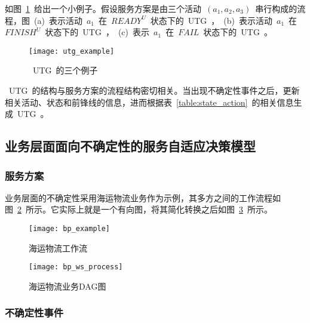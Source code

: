 如图~\ref{figure:utg_example}~给出一个小例子。假设服务方案是由三个活动~$(a_1, a_2, a_3)$~串行构成的流程，图~(a)~表示活动~$a_1$~在~$READY^U$~状态下的~UTG~，~(b)~表示活动~$a_1$~在~$FINISH^U$~状态下的~UTG~，~(c)~表示~$a_1$~在~$FAIL$~状态下的~UTG~。

\begin{figure}[htbp]
    \centering
    \texttt{[image: utg\_example]}
    \caption{~UTG~的三个例子}\label{figure:utg_example}
    \vspace{-1em}
\end{figure}

~UTG~的结构与服务方案的流程结构密切相关。当出现不确定性事件之后，更新相关活动、状态和前锋线的信息，进而根据表~\ref{table:state_action}~的相关信息生成~UTG~。

\subsection{业务层面面向不确定性的服务自适应决策模型}

\subsubsection{服务方案}

%

业务层面的不确定性采用海运物流业务作为示例，其多方之间的工作流程如图~\ref{figure:bp_example}~所示。它实际上就是一个有向图，将其简化转换之后如图~\ref{figure:bp_ws_process}~所示。

\begin{figure}[htbp]
    \centering
    \texttt{[image: bp\_example]}
    \caption{海运物流工作流}\label{figure:bp_example}
    \vspace{-1em}
\end{figure}

\begin{figure}[htbp]
    \centering
    \texttt{[image: bp\_ws\_process]}
    \caption{海运物流业务DAG图}\label{figure:bp_ws_process}
    \vspace{-1em}
\end{figure}

\subsubsection{不确定性事件} \label{sec:uc_bp}


